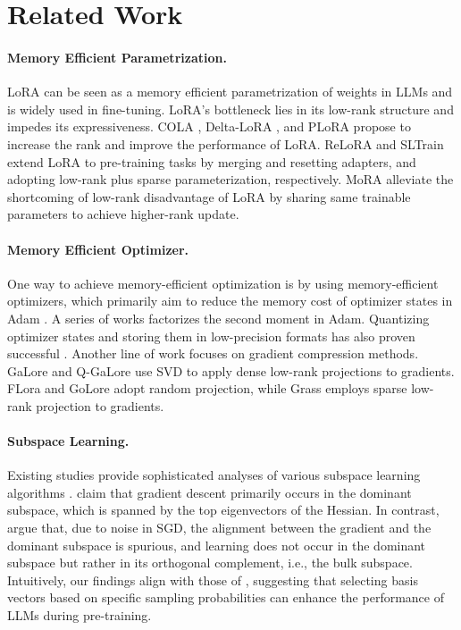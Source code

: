 \section{Related Work}
\label{sec:related-works}
\paragraph{Memory Efficient Parametrization.}
LoRA \cite{hu2021lora} can be seen as a memory efficient parametrization of weights in LLMs and is widely used in fine-tuning. LoRA's bottleneck lies in its low-rank structure and impedes its expressiveness. COLA \citep{xia2024chain}, Delta-LoRA \citep{zi2023delta}, and PLoRA \citep{meng2024periodiclora} propose to increase the rank and improve the performance of LoRA. ReLoRA \cite{lialin2023relora} and SLTrain \cite{han2024sltrain} extend LoRA to pre-training tasks by merging and resetting adapters, and adopting low-rank plus sparse parameterization, respectively. MoRA \citep{jiang2024mora} alleviate the shortcoming of low-rank disadvantage of LoRA by sharing same trainable parameters to achieve higher-rank update. 



\paragraph{Memory Efficient Optimizer.}
One way to achieve memory-efficient optimization is by using memory-efficient optimizers, which primarily aim to reduce the memory cost of optimizer states in Adam \cite{kingma2014adam}. A series of works \citep{shazeer2018adafactor, zhang2024adam-mini, luo2023came, zhao2024adapprox} factorizes the second moment in Adam. Quantizing optimizer states and storing them in low-precision formats has also proven successful \citep{li2024memory, dettmers20218}. Another line of work focuses on gradient compression methods. GaLore \cite{zhao2024galore} and Q-GaLore \cite{zhang2024q-galore} use SVD to apply dense low-rank projections to gradients. FLora \cite{hao2024flora} and GoLore \cite{he2024subspace} adopt random projection, while Grass \cite{muhamed2024grass} employs sparse low-rank projection to gradients.


\paragraph{Subspace Learning.}
Existing studies provide sophisticated analyses of various subspace learning algorithms \citep{cosson2023low, kozak2019stochastic, jadbabaie2023adaptive}. \cite{gur2018gradient} claim that gradient descent primarily occurs in the dominant subspace, which is spanned by the top eigenvectors of the Hessian. In contrast, \cite{song2024does} argue that, due to noise in SGD, the alignment between the gradient and the dominant subspace is spurious, and learning does not occur in the dominant subspace but rather in its orthogonal complement, i.e., the bulk subspace. Intuitively, our findings align with those of \cite{song2024does}, suggesting that selecting basis vectors based on specific sampling probabilities can enhance the performance of LLMs during pre-training.